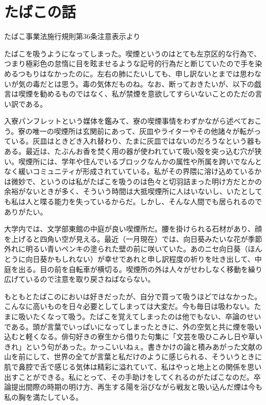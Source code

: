 \section{たばこの話}\label{sec:tabako}

\epigraph{


}
{たばこ事業法施行規則第36条注意表示より}


たばこを吸うようになってしまった。喫煙というのはとても左京区的な行為で、つまり極彩色の怠惰に目を眩ませるような記号的行為だと断じていたので手を染めるつもりはなかったのに。左右の肺にたいしても、申し訳ないとまでは思わないが気の毒だとは思う。毒の気体だものね。なお、断っておきたいが、以下の戯言は喫煙を勧めるものではなく、私が禁煙を意欲してすらいないことのただの言い訳である。

入寮パンフレットという媒体を鑑みて、寮の喫煙事情をわずかながら述べておこう。寮の唯一の喫煙所は玄関前にあって、灰皿やライターやその他諸々が転がっている。灰皿はときどき入れ替わり、たまに灰皿ではないのだろうなという器もある。最近は、たぶんお香を焚く用の器が使われていて吸い殻を突っ込む穴が狭い。喫煙所には、学年や住んでいるブロックなんかの属性や所属を跨いでなんとなく緩いコミュニティが形成されていている。私がその界隈に溶け込めているかは微妙で、というのは私がたばこを吸うのは色々と切羽詰まった明け方だとかの余裕がないときが多く、そういう時間は大抵喫煙所に人はいないし、いたとしても私は人と喋る能力を失っているからだ。しかし、そんな人間でも居られるのでありがたい。

大学内では、文学部東館の中庭が良い喫煙所だ。腰を掛けられる石材があり、顔を上げると四角い空が見える。最近（一月現在）では、向日葵みたいな花が季節外れに明るい青いペンキの塗られた壁の前に咲いていた。あのニセ向日葵（ほんとうに向日葵かもしれない）が幸せであれと申し訳程度の祈りを吐き出して、中庭を出る。目の前を自転車が横切る。喫煙所の外は人々がせわしなく移動を繰り広げているので注意を取り戻さねばならない。

もともとたばこのにおいは好きだったが、自分で買って吸うほどではなかった。こんなに高いものを日々必要としてしまっては大変だ。今も毎日は吸わない。たまに吸いたくなって吸う。たばこを覚えてしまったのは他でもない、卒論のせいである。頭が言葉でいっぱいになってしまったときに、外の空気と共に煙を吸い込むと軽くなる。俳句好きの寮生から借りた句集に「文芸を吸ひこみし日や草いきれ」という句があった。かっこいいねぇ。書きかけの論と積みあがった文献の山を前にして、世界の全てが言葉と私だけのように感じられる、そういうときに肌で鼻腔で舌で感じる気体は精彩に溢れていて、私はやっと地上との関係を思い出すことができる。私にとって、その手助けをしてくれるのがたばこなのだ。卒論提出間際の時期の明け方、再生する陽を浴びながら戦友と吸い込んだ煙は今も私の胸を満たしている。

